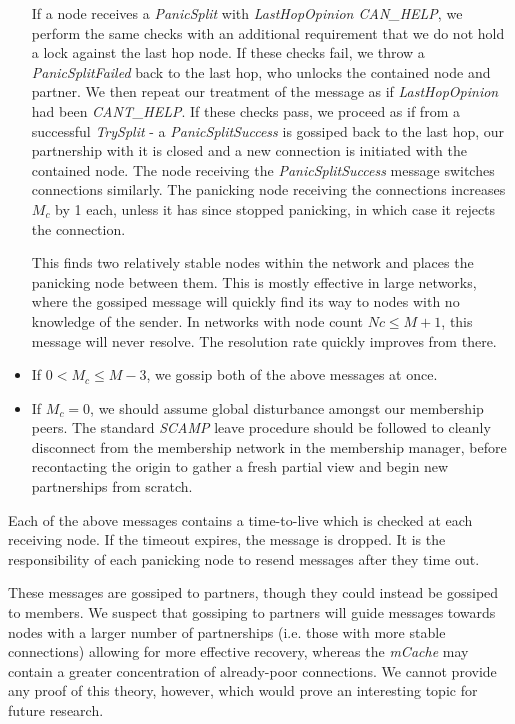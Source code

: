 \documentclass[12pt,a4paper]{article}
\begin{document}
\begin{itemize}
	If a node receives a \textit{PanicSplit} with \textit{LastHopOpinion CAN\_HELP}, we perform the same checks with an additional requirement that we do not hold a lock against the last hop node. If these checks fail, we throw a \textit{PanicSplitFailed} back to the last hop, who unlocks the contained node and partner. We then repeat our treatment of the message as if \textit{LastHopOpinion} had been \textit{CANT\_HELP}. If these checks pass, we proceed as if from a successful \textit{TrySplit} - a \textit{PanicSplitSuccess} is gossiped back to the last hop, our partnership with it is closed and a new connection is initiated with the contained node. The node receiving the \textit{PanicSplitSuccess} message switches connections similarly. The panicking node receiving the connections increases \(M_c\) by 1 each, unless it has since stopped panicking, in which case it rejects the connection.
	
	This finds two relatively stable nodes within the network and places the panicking node between them. This is mostly effective in large networks, where the gossiped message will quickly find its way to nodes with no knowledge of the sender. In networks with node count \(Nc \leq M + 1\), this message will never resolve. The resolution rate quickly improves from there.
	
	\item If \(0 < M_c \leq M - 3\), we gossip both of the above messages at once.
	
	\item If \(M_c = 0\), we should assume global disturbance amongst our membership peers. The standard \textit{SCAMP} leave procedure should be followed to cleanly disconnect from the membership network in the membership manager, before recontacting the origin to gather a fresh partial view and begin new partnerships from scratch.
\end{itemize}

Each of the above messages contains a time-to-live which is checked at each receiving node. If the timeout expires, the message is dropped. It is the responsibility of each panicking node to resend messages after they time out.

These messages are gossiped to partners, though they could instead be gossiped to members. We suspect that gossiping to partners will guide messages towards nodes with a larger number of partnerships (i.e. those with more stable connections) allowing for more effective recovery, whereas the \textit{mCache} may contain a greater concentration of already-poor connections. We cannot provide any proof of this theory, however, which would prove an interesting topic for future research.
\end{document}
